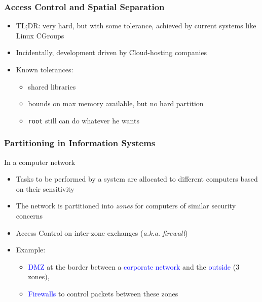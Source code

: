 \begin{reveals}
\begin{frame}
\end{frame}

\begin{frame}
  \frametitle{Access Control and Spatial Separation}

  \begin{itemize}[<+->]
  \item TL;DR: very hard, but with some tolerance, achieved by current
    systems like Linux CGroups
  \item Incidentally, development driven by Cloud-hosting companies
  \item Known tolerances:
    \begin{itemize}
    \item shared libraries
    \item bounds on max memory available, but no hard partition
    \item \texttt{root} still can do whatever he wants
    \end{itemize}
  \end{itemize}

\end{frame}

\begin{frame}
  \frametitle{Partitioning in Information Systems}

  \vfill

  \begin{block}{In a computer network}
    \begin{itemize}
    \item Tasks to be performed by a system are allocated to different
      computers based on their sensitivity
    \item The network is partitioned into \emph{zones} for computers
      of similar security concerns
    \item Access Control on inter-zone exchanges (\textit{a.k.a.}
      \emph{firewall}) 
    \item Example:
      \begin{itemize}
      \item \textcolor{blue}{DMZ} at the border between a
        \textcolor{blue}{corporate network} and the
        \textcolor{blue}{outside} (3 zones), 
      \item \textcolor{blue}{Firewalls} to control packets between these zones
      \end{itemize}

    \end{itemize}
  \end{block}


\end{frame}
\end{reveals}
